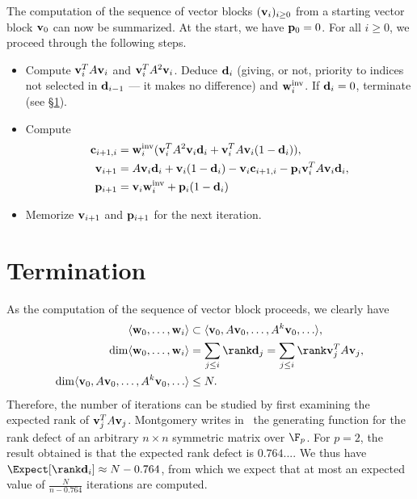 The computation of the sequence of vector blocks
$(\mathbf{v}_i)_{i\geq0}$ from a starting vector block $\mathbf{v}_0$ can now be
summarized. At the start, we have $\mathbf{p}_0=0$.
For all $i\geq 0$, we proceed through the following steps.
\begin{itemize}
    \item Compute $\mathbf{v}_i^TA\mathbf{v}_i$ and
        $\mathbf{v}_i^TA^2\mathbf{v}_i$.
        Deduce $\mathbf{d}_i$ (giving, or not, priority to indices not selected
        in $\mathbf{d}_{i-1}$ --- it makes no difference) and $\mathbf{w}_i^{\text{inv}}$.
        If $\mathbf{d}_i=0$, terminate (see §\ref{sec:blocklanczos:termination}).
    \item Compute
        \begin{align*}
            \mathbf{c}_{i+1,i}&=\mathbf{w}_i^{\text{inv}} (\mathbf{v}_i^TA^2\mathbf{v}_i\mathbf{d}_i +
            \mathbf{v}_i^TA\mathbf{v}_i(1-\mathbf{d}_i)),\\
            \mathbf{v}_{i+1}&=A\mathbf{v}_i\mathbf{d}_i + \mathbf{v}_i(1-\mathbf{d}_i)
            -\mathbf{v}_i\mathbf{c}_{i+1,i}
            -\mathbf{p}_i\mathbf{v}_i^TA\mathbf{v}_i\mathbf{d}_i,\\
            \mathbf{p}_{i+1}&=\mathbf{v}_{i}\mathbf{w}_{i}^{\text{inv}}+\mathbf{p}_{i}(1-\mathbf{d}_{i})
        \end{align*}
    \item Memorize $\mathbf{v}_{i+1}$ and $\mathbf{p}_{i+1}$ for the next iteration.
\end{itemize}

\section{Termination}
\label{sec:blocklanczos:termination}

As the computation of the sequence of vector block proceeds, we clearly
have
\begin{align*}
    \langle\bfw_0,\ldots,\bfw_i\rangle&\subset\langle\bfv_0,A\bfv_0,\ldots,A^k\bfv_0,\ldots\rangle,\\
    \dim\langle\bfw_0,\ldots,\bfw_i\rangle&=\sum_{j\leq
i}\rank\bfd_j=\sum_{j\leq i}\rank\bfv_j^TA\bfv_j,\\
    \dim\langle\bfv_0,A\bfv_0,\ldots,A^k\bfv_0,\ldots\rangle&\leq N.
\end{align*}
Therefore, the number of iterations can be studied by first examining the
expected rank of $\mathbf{v}_j^TA\mathbf{v}_j$. Montgomery writes
in~\cite{EC:Montgomery95} the generating
function for the rank defect of an arbitrary $n\times n$ symmetric matrix
over $\F_p$. For $p=2$, the result obtained is that the expected rank
defect is $0.764...$. We thus have
$\Expect[\rank\bfd_i]\approx N-0.764$, from which we expect
that at most an expected value of $\frac{N}{n-0.764}$ iterations are
computed.


